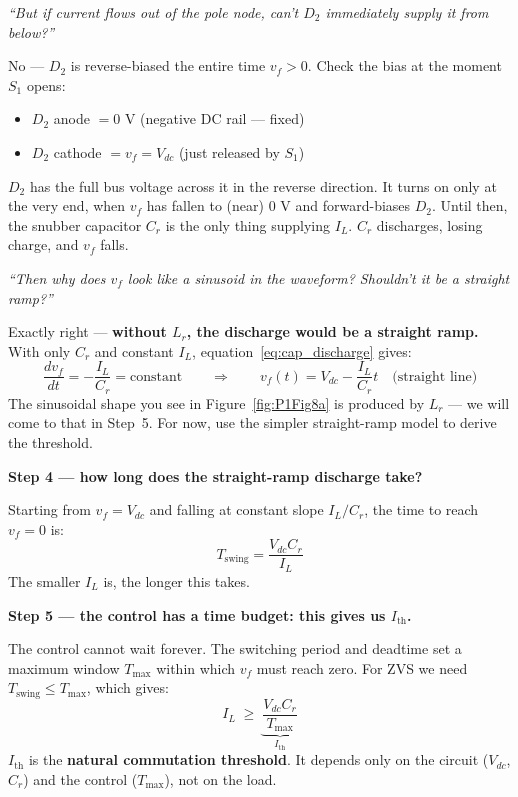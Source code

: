 \documentclass[12pt, a4paper]{article}
\def\,{ }%
\newcommand{\Vdc}{V_{dc}}
\newcommand{\vf}{v_f}
\newcommand{\IL}{I_L}
\newcommand{\Lr}{L_r}
\newcommand{\figref}[1]{Figure~\ref{#1}}
\begin{document}
\medskip
\textit{``But if current flows out of the pole node, can't $D_2$
immediately supply it from below?''}

No --- $D_2$ is reverse-biased the entire time $\vf > 0$.
Check the bias at the moment $S_1$ opens:
\begin{itemize}
    \item $D_2$ anode $= 0$\,V (negative DC rail --- fixed)
    \item $D_2$ cathode $= \vf = \Vdc$ (just released by $S_1$)
\end{itemize}
$D_2$ has the full bus voltage across it in the reverse direction.
It turns on only at the very end, when $\vf$ has fallen to (near) 0\,V
and forward-biases $D_2$.
Until then, the snubber capacitor $C_r$ is the only thing supplying $\IL$.
$C_r$ discharges, losing charge, and $\vf$ falls.

\medskip
\textit{``Then why does $\vf$ look like a sinusoid in the waveform?
Shouldn't it be a straight ramp?''}

Exactly right --- \textbf{without $\Lr$, the discharge would be a straight
ramp.}
With only $C_r$ and constant $\IL$, equation~\eqref{eq:cap_discharge}
gives:
\[
    \frac{d\vf}{dt} = -\frac{\IL}{C_r} = \text{constant}
    \qquad\Rightarrow\qquad
    \vf(t) = \Vdc - \frac{\IL}{C_r}\,t \quad\text{(straight line)}
\]
The sinusoidal shape you see in \figref{fig:P1Fig8a} is produced by
$\Lr$ --- we will come to that in Step~5.
For now, use the simpler straight-ramp model to derive the threshold.

\medskip
\textbf{Step 4 — how long does the straight-ramp discharge take?}

Starting from $\vf = \Vdc$ and falling at constant slope $\IL/C_r$, the
time to reach $\vf = 0$ is:
\begin{equation}
    T_\text{swing} = \frac{\Vdc\,C_r}{\IL}
    \label{eq:Tswing}
\end{equation}
The smaller $\IL$ is, the longer this takes.

\medskip
\textbf{Step 5 — the control has a time budget: this gives us $I_\text{th}$.}

The control cannot wait forever.
The switching period and deadtime set a maximum window $T_\text{max}$
within which $\vf$ must reach zero.
For ZVS we need $T_\text{swing} \leq T_\text{max}$, which gives:
\begin{equation}
    \IL \;\geq\; \underbrace{\frac{\Vdc\,C_r}{T_\text{max}}}_{\displaystyle I_\text{th}}
    \label{eq:Ith}
\end{equation}
$I_\text{th}$ is the \textbf{natural commutation threshold}.
It depends only on the circuit ($\Vdc$, $C_r$) and the control
($T_\text{max}$), not on the load.
\end{document}
